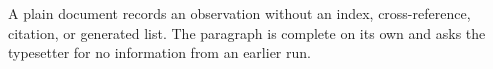 \documentclass{article}
\begin{document}
A plain document records an observation without an index, cross-reference, citation, or generated list. The paragraph is complete on its own and asks the typesetter for no information from an earlier run.
\end{document}
